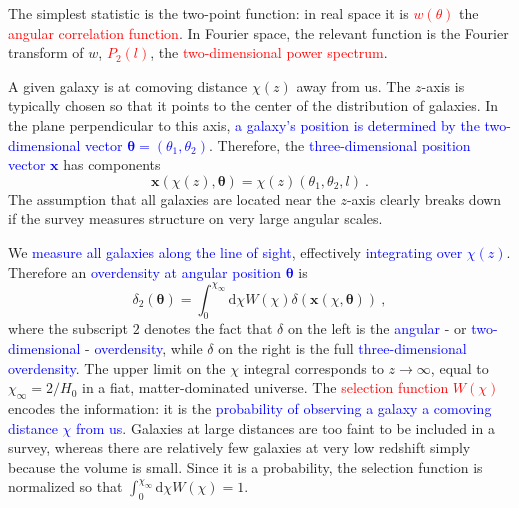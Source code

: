 \documentclass[12pt,a4paper]{article}
\renewcommand{\vec}[1]{\boldsymbol{#1}}
\newcommand{\dif}{\mathrm{d}}
\begin{document}
\cite{2003moco.book.....D} The simplest statistic is the two-point function: in real space it is \textcolor{red}{$w(\theta)$} the \textcolor{red}{angular correlation function}. In Fourier space, the relevant function is the Fourier transform of $w$, \textcolor{red}{$P_2(l)$}, the \textcolor{red}{two-dimensional power spectrum}. 

A given galaxy is at comoving distance $\chi(z)$ away from us. The $z$-axis is typically chosen so that it points to the center of the distribution of galaxies. In the plane perpendicular to this axis, \textcolor{blue}{a galaxy's position is determined by the two-dimensional vector $\vec{\theta} = (\theta_1, \theta_2)$}. Therefore, the \textcolor{blue}{three-dimensional position vector $\vec{x}$} has components 
\begin{equation}
\vec{x}(\chi(z), \vec{\theta}) = \chi(z)(\theta_1, \theta_2, l) ~.
\end{equation}
The assumption that all galaxies are located near the $z$-axis clearly breaks down if the survey measures structure on very large angular scales.

We \textcolor{blue}{measure all galaxies along the line of sight}, effectively \textcolor{blue}{integrating over $\chi(z)$}. Therefore an \textcolor{blue}{overdensity at angular position $\vec{\theta}$} is 
\begin{equation}
\delta_2(\vec{\theta}) = \int_0^{\chi_{\infty}} \dif \chi W(\chi) \delta(\vec{x}(\chi, \vec{\theta})) ~,
\end{equation}
where the subscript $2$ denotes the fact that $\delta$ on the left is the \textcolor{blue}{angular} - or \textcolor{blue}{two-dimensional} - \textcolor{blue}{overdensity}, while $\delta$ on the right is the full \textcolor{blue}{three-dimensional overdensity}. The upper limit on the $\chi$ integral corresponds to $z \rightarrow \infty$, equal to $\chi_\infty = 2/H_0$ in a fiat, matter-dominated universe. The \textcolor{red}{selection function $W(\chi)$} encodes the information: it is the \textcolor{blue}{probability of observing a galaxy a comoving distance $\chi$ from us}. Galaxies at large distances are too faint to be included in a survey, whereas there are relatively few galaxies at very low redshift simply because the volume is small. Since it is a probability, the selection function is normalized so that $ \int_0^{\chi_{\infty}} \dif \chi W(\chi) = 1$.
\end{document}
